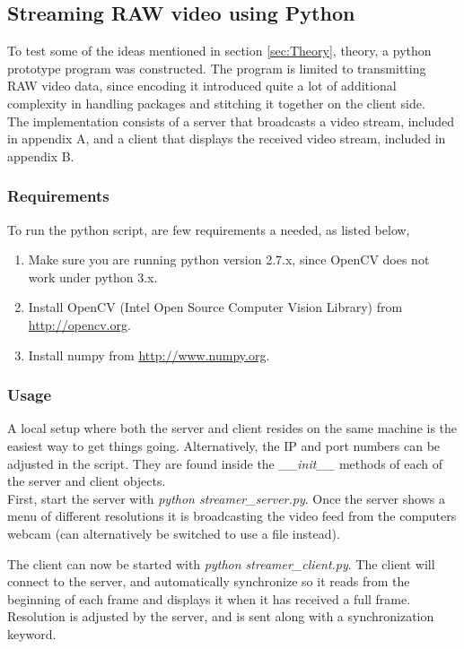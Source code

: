 \subsection{Streaming RAW video using Python}\label{subsec:python}
To test some of the ideas mentioned in section \ref{sec:Theory}, theory, a python prototype program was constructed. The program is limited to transmitting RAW video data, since encoding it introduced quite a lot of additional complexity in handling packages and stitching it together on the client side.\\

The implementation consists of a server that broadcasts a video stream, included in appendix A, and a client that displays the received video stream, included in appendix B.

\subsubsection{Requirements}
To run the python script, are few requirements a needed, as listed below,

\begin{enumerate}
    \item Make sure you are running python version 2.7.x, since OpenCV does not work under python 3.x.
    \item Install OpenCV (Intel Open Source Computer Vision Library) from \url{http://opencv.org}.
    \item Install numpy from \url{http://www.numpy.org}.
\end{enumerate}


\subsubsection{Usage}
A local setup where both the server and client resides on the same machine is the easiest way to get things going. Alternatively, the IP and port numbers can be adjusted in the script. They are found inside the \textit{\_\_init\_\_} methods of each of the server and client objects.\\

First, start the server with \textit{python streamer\_server.py}. Once the server shows a menu of different resolutions it is broadcasting the video feed from the computers webcam (can alternatively be switched to use a file instead). 

The client can now be started with \textit{python streamer\_client.py}. The client will connect to the server, and automatically synchronize so it reads from the beginning of each frame and displays it when it has received a full frame. Resolution is adjusted by the server, and is sent along with a synchronization keyword.\\

